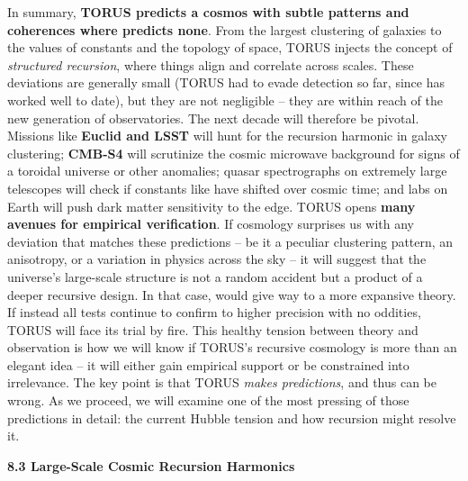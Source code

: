 \documentclass[
]{article}
\begin{document}
In summary, \textbf{TORUS predicts a cosmos with subtle patterns and
coherences where \LambdaCDM predicts none}. From the largest clustering of
galaxies to the values of constants and the topology of space, TORUS
injects the concept of \emph{structured recursion}, where things align
and correlate across scales. These deviations are generally small (TORUS
had to evade detection so far, since \LambdaCDM has worked well to date), but
they are not negligible -- they are within reach of the new generation
of observatories. The next decade will therefore be pivotal. Missions
like \textbf{Euclid and LSST} will hunt for the recursion harmonic in
galaxy clustering; \textbf{CMB-S4} will scrutinize the cosmic microwave
background for signs of a toroidal universe or other
anomalies\hspace{0pt}; quasar spectrographs on extremely large
telescopes will check if constants like \alpha have shifted over cosmic
time\hspace{0pt}; and labs on Earth will push dark matter sensitivity to
the edge. TORUS opens \textbf{many avenues for empirical
verification}\hspace{0pt}. If cosmology surprises us with any deviation
that matches these predictions -- be it a peculiar clustering pattern,
an anisotropy, or a variation in physics across the sky -- it will
suggest that the universe's large-scale structure is not a random
accident but a product of a deeper recursive design. In that case, \LambdaCDM
would give way to a more expansive theory. If instead all tests continue
to confirm \LambdaCDM to higher precision with no oddities, TORUS will face
its trial by fire. This healthy tension between theory and observation
is how we will know if TORUS's recursive cosmology is more than an
elegant idea -- it will either gain empirical support or be constrained
into irrelevance. The key point is that TORUS \emph{makes predictions},
and thus can be wrong. As we proceed, we will examine one of the most
pressing of those predictions in detail: the current Hubble tension and
how recursion might resolve it.

\textbf{8.3 Large-Scale Cosmic Recursion Harmonics}
\end{document}
